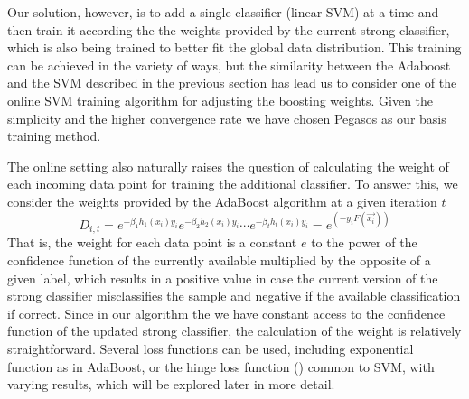 Our solution, however, is to add a single classifier (linear SVM) at a time and then train it according the the weights provided by the current strong classifier, which is also being trained to better fit the global data distribution. This training can be achieved in the variety of ways, but the similarity between the Adaboost and the SVM described in the previous section has lead us to consider one of the online SVM training algorithm for adjusting the boosting weights. Given the simplicity and the higher convergence rate we have chosen Pegasos as our basis training method. 

The online setting also naturally raises the question of calculating the weight of each incoming data point for training the additional classifier.  To answer this, we consider the weights provided by the AdaBoost algorithm at a given iteration $t$
$$
D_{i,t} = e^{-\beta_1 h_1(x_i) y_i}e^{-\beta_2 h_2(x_i) y_i}\cdots e^{-\beta_t h_t(x_i) y_i}=e^(-y_i F(\vec{x_i}))
$$
That is, the weight for each data point is a constant $e$ to the power of the confidence function of the currently available multiplied by the opposite of a given label, which results in a positive value in case the current version of the strong classifier misclassifies the sample and negative if the available classification if correct. Since in our algorithm the we have constant access to the confidence function of the updated strong classifier, the calculation of the weight is relatively straightforward. Several loss functions can be used, including exponential function as in AdaBoost, or the hinge loss function () common to SVM, with varying results, which will be explored later in more detail. 
